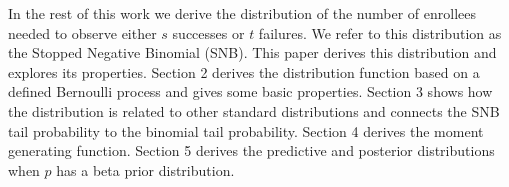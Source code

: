 \documentclass[review]{elsarticle}
\begin{document}

In the rest of this work we derive the distribution of the number of 
enrollees needed
to observe either $s$ successes or $t$ failures. We refer to this distribution
as the Stopped Negative Binomial (SNB). 
This paper derives this distribution and explores its properties.
Section 2 derives the distribution function
based on a defined Bernoulli process and gives some basic properties.
Section 3 shows how the distribution is related to other standard
distributions and connects the SNB tail probability to the binomial tail 
probability.
Section 4 derives the moment generating function.
Section 5 derives the predictive and posterior distributions when $p$ has a 
beta prior distribution.
\end{document}
